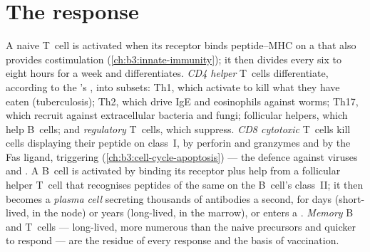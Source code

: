 \section{The response}

\begin{definition}\label{def:b3:adaptive-immunity:response}
A naive T~cell is activated when its receptor binds peptide--MHC on a
 that also provides costimulation (\cref{ch:b3:innate-immunity});
it then divides every six to eight hours for a week and differentiates.
\emph{CD4 helper} T~cells differentiate, according to the 's , into subsets: Th1, which activate  to kill
what they have eaten (tuberculosis); Th2, which drive IgE and
eosinophils against worms; Th17, which recruit  against
extracellular bacteria and fungi; follicular helpers, which help
B~cells; and \emph{regulatory} T~cells, which suppress. \emph{CD8
cytotoxic} T~cells kill cells displaying their peptide on class~I, by
perforin and granzymes and by the Fas ligand, triggering 
(\cref{ch:b3:cell-cycle-apoptosis}) --- the defence against viruses and
. A B~cell is activated by  binding its receptor plus
help from a follicular helper T~cell that recognises peptides of the
same  on the B~cell's class~II; it then becomes a \emph{plasma
cell} secreting thousands of antibodies a second, for days (short-lived,
in the node) or years (long-lived, in the marrow), or enters a . \emph{Memory} B and T~cells --- long-lived, more numerous than
the naive precursors and quicker to respond --- are the residue of every
response and the basis of vaccination.
\end{definition}

